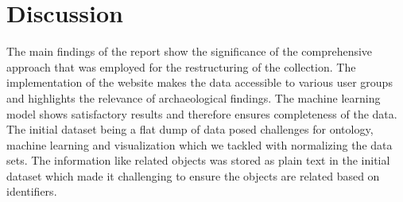 \section{Discussion} 

The main findings of the report show the significance of the comprehensive approach that was employed for the restructuring of the collection. The implementation of the website makes the data accessible to various user groups and highlights the relevance of archaeological findings. The machine learning model shows satisfactory results and therefore ensures completeness of the data.  The initial dataset being a flat dump of data posed challenges for ontology, machine learning and visualization which we tackled with normalizing the data sets. The information like related objects was stored as plain text in the initial dataset which made it challenging to ensure the objects are related based on identifiers.
